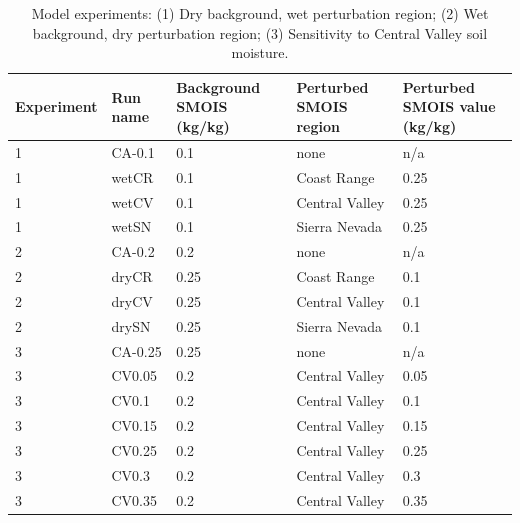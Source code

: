 \begin{table}
\begin{tabular}{p{2.5cm} l p{3cm} p{3cm} p{3.5cm}}
\hline
Experiment & Run name & Background SMOIS (kg/kg) & Perturbed SMOIS region & Perturbed SMOIS value (kg/kg) \\
\hline
1 & CA-0.1 & 0.1 & none & n/a \\
1 & wetCR & 0.1 & Coast Range & 0.25 \\
1 & wetCV & 0.1 & Central Valley & 0.25 \\
1 & wetSN & 0.1 & Sierra Nevada & 0.25 \\
2 & CA-0.2 & 0.2 & none & n/a \\
2 & dryCR & 0.25 & Coast Range & 0.1 \\
2 & dryCV & 0.25 & Central Valley & 0.1 \\
2 & drySN & 0.25 & Sierra Nevada & 0.1 \\
3 & CA-0.25 & 0.25 & none & n/a \\
3 & CV0.05 & 0.2 & Central Valley & 0.05 \\
3 & CV0.1 & 0.2 & Central Valley & 0.1 \\
3 & CV0.15 & 0.2 & Central Valley & 0.15 \\
3 & CV0.25 & 0.2 & Central Valley & 0.25 \\
3 & CV0.3 & 0.2 & Central Valley & 0.3 \\
3 & CV0.35 & 0.2 & Central Valley & 0.35 \\
\hline
\end{tabular}
\caption{Model experiments: (1) Dry background, wet perturbation region; (2) Wet background, dry perturbation region; (3) Sensitivity to Central Valley soil moisture.}
\label{table:windSol_runlist}
\end{table}

%
